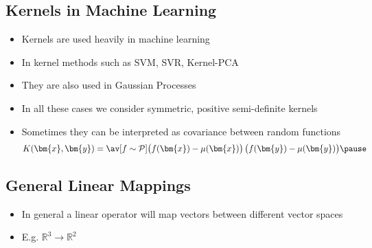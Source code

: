 
\begin{slide}
\section[-1]{Kernels in Machine Learning}

\begin{PauseHighLight}
  \begin{itemize}
  \item Kernels are used heavily in machine learning\pause
  \item In kernel methods such as SVM, SVR, Kernel-PCA\pause
  \item They are also used in Gaussian Processes\pause
  \item In all these cases we consider symmetric, positive
    semi-definite kernels\pause
  \item Sometimes they can be interpreted as covariance between random functions
    \begin{align*}
      K(\bm{x},\bm{y})
      = \av[f\sim\mathcal{P}]{\left(\strut f(\bm{x})-\mu(\bm{x})\right)
      \left(\strut f(\bm{y})-\mu(\bm{y})\right)}\pause
    \end{align*}
  \end{itemize}
\end{PauseHighLight}


\end{slide}


\begin{slide}
\section[-2]{General Linear Mappings}

\pb\pause{}
\begin{itemize}
\item In general a linear operator will map vectors between different
  vector spaces\pauseh
\item E.g. $\mathbb{R}^3 \rightarrow \mathbb{R}^2$\pauseh{}
  \begin{center}
    \pause
  \end{center}
\end{itemize}


\end{slide}

